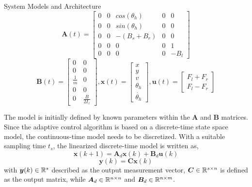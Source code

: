 \begin{section}{System Models and Architecture}
    \begin{equation}
	\bm{A}(t)=\begin{bmatrix} 0 & 0 & cos(\theta_h) & 0 & 0\\ 0 & 0 & sin(\theta_h) & 0 & 0 \\ 0 & 0 & -(B_s+B_r) & 0 & 0 \\ 0 & 0 & 0 & 0 & 1 \\ 0 & 0 & 0 & 0 & -B_l \end{bmatrix} \nonumber
	\end{equation}
	\begin{equation}
	\bm{B}(t)=\begin{bmatrix} 0 & 0 \\ 0 & 0 \\ \frac{1}{m} & 0 \\ 0 & 0 \\ 0 & \frac{B}{2I_z} \end{bmatrix}, 
     \bm{x}(t)=\begin{bmatrix} x \\ y \\ v \\ \theta_h \\ \dot{\theta_h} \end{bmatrix}, \bm{u}(t)= \begin{bmatrix} F_l+F_r \\ F_l-F_r  \end{bmatrix}  \nonumber
	\end{equation}

The model is initially defined by known parameters within the $\bm{A}$ and $\bm{B}$ matrices. Since the adaptive control algorithm is based on a discrete-time state space model, the continuous-time model needs to be discretized. With a suitable sampling time $t_s$, the linearized discrete-time model is written as,
    \begin{equation}
    \label{eq:discritzed_SS_model}
	\bm{x}(k+1) = \bm{A}_d\bm{x}(k) + \bm{B}_d\bm{u}(k)
	\end{equation}
	\begin{equation}
	\bm{y}(k)=\bm{C}\bm{x}(k)
	\end{equation}
with $\bm{y}(k) \in \mathbb{R}^{s}$ described as the output measurement vector, $\bm{C} \in \mathbb{R}^{s\times n}$ is defined as the output matrix, while $\bm{A}_d \in \mathbb{R}^{n\times n}$ and $\bm{B}_d \in \mathbb{R}^{n\times m}$.



\end{section}
